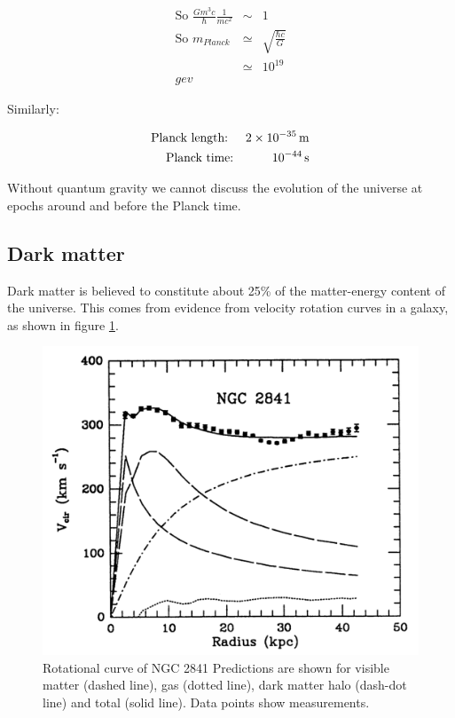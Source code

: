\begin{eqnarray*}
  \textrm{So } \frac{Gm^3c}{\hbar}\frac{1}{mc^2} & \sim & 1 \\
  \textrm{So } m_{Planck} & \simeq & \sqrt{\frac{\hbar c}{G}} \\
  &\simeq & 10^{19} \\gev
\end{eqnarray*}

Similarly:

\begin{eqnarray*}
  \textrm{Planck length: } & & 2 \times 10^{-35}\mathrm{\,m} \\
  \textrm{Planck time:}    & & 10^{-44} \mathrm{\,s}
\end{eqnarray*}

Without quantum gravity we cannot discuss the evolution of the universe at epochs around and before the Planck time.

\subsection{Dark matter}

Dark matter is believed to constitute about 25\% of the matter-energy content of the universe.  This comes from evidence from velocity rotation curves in a galaxy, as shown in figure \ref{fig:ch1_galacticCurve}.

\begin{figure}[!htb]
  \begin{center}
    \includegraphics[width=\textwidth]{images/chapter_1/galacticCurve.pdf}
    \caption[Rotational curve of NGC 2841]{Rotational curve of NGC 2841  Predictions are shown for visible matter (dashed line), gas (dotted line), dark matter halo (dash-dot line) and total (solid line).  Data points show measurements. \cite{galacticCurve}}
    \label{fig:ch1_galacticCurve}
  \end{center}
\end{figure}

